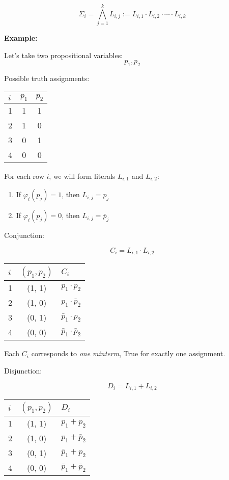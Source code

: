 \documentclass[12pt,a4paper,openany]{article}
\begin{document}
$$\Sigma_i = \displaystyle\bigwedge_{j=1}^k L_{i,j} := L_{i,1} \cdot L_{i,2} \cdot \cdots \cdot L_{i,k}$$

\textbf{Example:}

Let's take two propositional variables:
$$p_1, p_2$$

Possible truth assignments:

\begin{center}
\begin{tabular}{|l|c|c|}
\hline
$i$ & $p_1$ & $p_2$ \\
\hline
1 & 1 & 1 \\
\hline
2 & 1 & 0 \\
\hline
3 & 0 & 1 \\
\hline
4 & 0 & 0 \\
\hline
\end{tabular}
\end{center}

For each row $i$, we will form literals $L_{i,1}$ and $L_{i,2}$:
\begin{enumerate}
\item If $\varphi_i(p_j) = 1$, then $L_{i,j} = p_j$ 
\item If $\varphi_i(p_j) = 0$, then $L_{i,j} = \bar p_j$
\end{enumerate}

Conjunction:

$$C_i = L_{i,1} \cdot L_{i,2}$$

\begin{center}
\begin{tabular}{|l|c|l|}
\hline
$i$ & $(p_1, p_2)$ & $C_i$ \\
\hline
1 & (1, 1) & $p_1 \cdot p_2$ \\
\hline
2 & (1, 0) & $p_1 \cdot \bar p_2$ \\
\hline
3 & (0, 1) & $\bar p_1 \cdot p_2$ \\
\hline
4 & (0, 0) & $\bar p_1 \cdot \bar p_2$ \\
\hline
\end{tabular}
\end{center}

Each $C_i$ corresponds to \emph{one minterm}, True for exactly one
assignment.

Disjunction:

$$D_i = L_{i,1} + L_{i,2}$$

\begin{center}
\begin{tabular}{|l|c|l|}
\hline
$i$ & $(p_1, p_2)$ & $D_i$ \\
\hline
1 & (1, 1) & $p_1 + p_2$ \\
\hline
2 & (1, 0) & $p_1 + \bar p_2$ \\
\hline
3 & (0, 1) & $\bar p_1 + p_2$ \\
\hline
4 & (0, 0) & $\bar p_1 + \bar p_2$ \\
\hline
\end{tabular}
\end{center}
\end{document}
